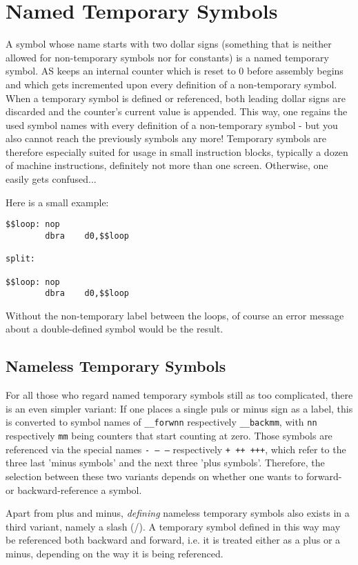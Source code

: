 \documentclass[12pt,twoside]{report}
\begin{document}
\section{Named Temporary Symbols}

A symbol whose name starts with two dollar signs (something that is
neither allowed for non-temporary symbols nor for constants) is a named
temporary symbol.  AS keeps an internal counter which is reset to 0 before
assembly begins and which gets incremented upon every definition of a
non-temporary symbol.  When a temporary symbol is defined or referenced,
both leading dollar signs are discarded and the counter's current value is
appended.  This way, one regains the used symbol names with every
definition of a non-temporary symbol - but you also cannot reach the
previously symbols any more! Temporary symbols are therefore especially
suited for usage in small instruction blocks, typically a dozen of machine
instructions, definitely not more than one screen.  Otherwise, one easily
gets confused...

Here is a small example:
\begin{verbatim}
$$loop: nop
        dbra    d0,$$loop

split:

$$loop: nop
        dbra    d0,$$loop
\end{verbatim}
Without the non-temporary label between the loops, of course an error
message about a double-defined symbol would be the result.

\subsection{Nameless Temporary Symbols}

For all those who regard named temporary symbols still as too complicated,
there is an even simpler variant: If one places a single puls or minus
sign as a label, this is converted to symbol names of {\tt \_\_forwnn}
respectively {\tt \_\_backmm}, with {\tt nn} respectively {\tt mm} being
counters that start counting at zero.  Those symbols are referenced via
the special names {\tt - -- ---} respectively {\tt + ++ +++}, which refer
to the three last 'minus symbols' and the next three 'plus symbols'. 
Therefore, the selection between these two variants depends on whether one
wants to forward- or backward-reference a symbol.

Apart from plus and minus, {\em defining} nameless temporary symbols also
exists in a third variant, namely a slash (/).  A temporary symbol defined
in this way may be referenced both backward and forward, i.e. it is
treated either as a plus or a minus, depending on the way it is being
referenced.
\end{document}
